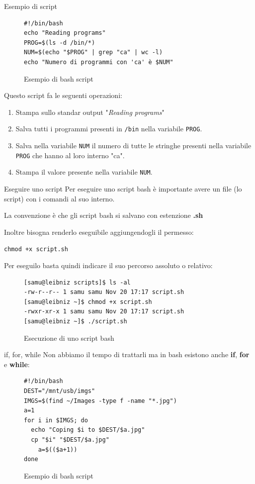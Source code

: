 \documentclass{beamer}
\begin{document}
\begin{frame}[fragile]{Esempio di script}
  \begin{figure}
    \begin{lstlisting}
#!/bin/bash
echo "Reading programs"
PROG=$(ls -d /bin/*)
NUM=$(echo "$PROG" | grep "ca" | wc -l)
echo "Numero di programmi con 'ca' è $NUM"
    \end{lstlisting}
    \caption{Esempio di bash script}
  \end{figure}

  Questo script fa le seguenti operazioni:
  \begin{enumerate}
    \item Stampa sullo standar output "\textit{Reading programs}"
    \item Salva tutti i programmi presenti in \texttt{/bin} nella variabile 
      \texttt{PROG}.
    \item Salva nella variabile \texttt{NUM} il numero di tutte le stringhe 
      presenti nella variabile \texttt{PROG} che hanno al loro interno "ca".
    \item Stampa il valore presente nella variabile \texttt{NUM}.
  \end{enumerate}
\end{frame}

\begin{frame}[fragile]{Eseguire uno script}
  Per eseguire uno script bash è importante avere un file (lo script) con i 
  comandi al suo interno. \medskip

  La convenzione è che gli script bash si salvano con estenzione \textbf{.sh}
  \medskip

  Inoltre bisogna renderlo eseguibile aggiungendogli il permesso: \smallskip

  \texttt{chmod +x script.sh} \medskip

  Per eseguilo basta quindi indicare il suo percorso assoluto o relativo:
  \begin{figure}
    \begin{lstlisting}
[samu@leibniz scripts]$ ls -al
-rw-r--r-- 1 samu samu Nov 20 17:17 script.sh
[samu@leibniz ~]$ chmod +x script.sh
-rwxr-xr-x 1 samu samu Nov 20 17:17 script.sh
[samu@leibniz ~]$ ./script.sh
    \end{lstlisting}
    \caption{Esecuzione di uno script bash}
  \end{figure}
\end{frame}

\begin{frame}[fragile]{if, for, while}
  Non abbiamo il tempo di trattarli ma in bash esistono anche \textbf{if}, 
  \textbf{for} e \textbf{while}:
  \begin{figure}
    \begin{lstlisting}
#!/bin/bash
DEST="/mnt/usb/imgs"
IMGS=$(find ~/Images -type f -name "*.jpg")
a=1
for i in $IMGS; do
  echo "Coping $i to $DEST/$a.jpg"
  cp "$i" "$DEST/$a.jpg"
    a=$(($a+1))
done
    \end{lstlisting}
    \caption{Esempio di bash script}
  \end{figure}
\end{frame}
\end{document}
